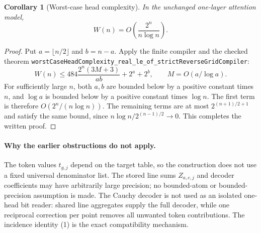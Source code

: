 \documentclass[11pt]{article}
\newtheorem{corollary}{Corollary}
\begin{document}
\begin{corollary}[Worst-case head complexity]
In the unchanged one-layer attention model,
\[
 W(n)=O\!\left(\frac{2^n}{n\log n}\right).
\]
\end{corollary}
\begin{proof}
Put $a=\lfloor n/2\rfloor$ and $b=n-a$. Apply the finite compiler and the
checked theorem
\texttt{worstCaseHeadComplexity\_real\_le\_of\_strictReverseGridCompiler}:
\[
 W(n)\leq
 484\frac{2^n(3M+3)}{ab}+2^a+2^b,
 \qquad M=O(a/\log a).
\]
For sufficiently large $n$, both $a,b$ are bounded below by a positive
constant times $n$, and $\log a$ is bounded below by a positive constant
times $\log n$. The first term is therefore $O(2^n/(n\log n))$.
The remaining terms are at most $2^{(n+1)/2+1}$ and satisfy the same bound,
since $n\log n/2^{(n-1)/2}\longrightarrow0$. This completes the written proof.
\end{proof}

\paragraph{Why the earlier obstructions do not apply.}
The token values $t_{g,j}$ depend on the target table, so the construction
does not use a fixed universal denominator list. The stored line sums
$Z_{a,c,j}$ and decoder coefficients may have arbitrarily large precision;
no bounded-atom or bounded-precision assumption is made. The Cauchy decoder
is not used as an isolated one-head bit reader: shared line aggregates
supply the full decoder, while one reciprocal correction per point removes
all unwanted token contributions. The incidence identity (1) is the exact
compatibility mechanism.
\end{document}
